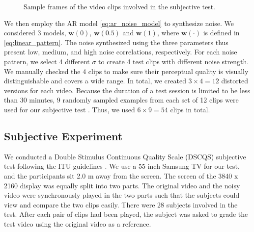 \documentclass{sig-alternate}
\begin{document}
\begin{figure}[!h]
{}
\caption[Optional caption for list of figures]{
Sample frames of the video clips involved in the subjective test.
}
\label{fig:sampleframe}
\end{figure}

We then employ the AR model \eqref{eq:ar_noise_model} to synthesize noise. We considered 3 models, $\mathbf{w}(0)$, $\mathbf{w}(0.5)$ and $\mathbf{w}(1)$, where $\mathbf{w}(\cdot)$ is defined in \eqref{eq:linear_pattern}. The noise synthesized using the three parameters thus present low, medium, and high noise correlations, respectively. For each noise pattern, we select 4 different $\sigma$ to create 4 test clips with different noise strength. We manually checked the 4 clips to make sure their perceptual quality is visually distinguishable and covers a wide range. In total, we created $3\times4=12$ distorted versions for each video. Because the duration of a test session is limited to be less than 30 minutes, 9 randomly sampled examples from each set of 12 clips were used for our subjective test \cite{ITU}. Thus, we used $6\times9=54$ clips in total.
\subsection{Subjective Experiment}
\label{sec:subjective_study}
We conducted a Double Stimulus Continuous Quality Scale (DSCQS) subjective test following the ITU guidelines \cite{ITU}. We use a 55 inch Samsung TV for our test, and the participants sit 2.0 m away from the screen. 
The screen of the 3840 x 2160 display was equally split into two parts. The original video and the noisy video were synchronously played in the two parts such that the subjects could view and compare the two clips easily. There were 28 subjects involved in the test. After each pair of clips had been played, the subject was asked to grade the test video using the original video as a reference.
\end{document}
